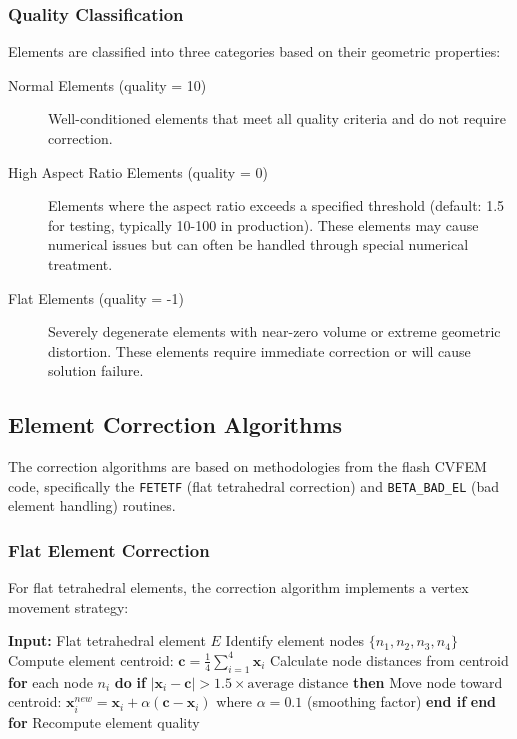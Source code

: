 \documentclass[12pt]{extarticle}
\newcommand{\<}{\langle}
\renewcommand{\>}{\rangle}
\theoremstyle{definition}
\begin{document}
\subsubsection{Quality Classification}

Elements are classified into three categories based on their geometric properties:

\begin{description}
    \item[Normal Elements (quality = 10)] Well-conditioned elements that meet all quality criteria and do not require correction.
    
    \item[High Aspect Ratio Elements (quality = 0)] Elements where the aspect ratio exceeds a specified threshold (default: 1.5 for testing, typically 10-100 in production). These elements may cause numerical issues but can often be handled through special numerical treatment.
    
    \item[Flat Elements (quality = -1)] Severely degenerate elements with near-zero volume or extreme geometric distortion. These elements require immediate correction or will cause solution failure.
\end{description}

\subsection{Element Correction Algorithms}

The correction algorithms are based on methodologies from the flash CVFEM code, specifically the \texttt{FETETF} (flat tetrahedral correction) and \texttt{BETA\_BAD\_EL} (bad element handling) routines.

\subsubsection{Flat Element Correction}

For flat tetrahedral elements, the correction algorithm implements a vertex movement strategy:

\begin{algorithm}
\caption{Flat Element Correction (FETETF)}
\begin{algorithmic}[1]
\State \textbf{Input:} Flat tetrahedral element $E$
\State Identify element nodes $\{n_1, n_2, n_3, n_4\}$
\State Compute element centroid: $\mathbf{c} = \frac{1}{4}\sum_{i=1}^{4} \mathbf{x}_i$
\State Calculate node distances from centroid
\State \textbf{for} each node $n_i$ \textbf{do}
    \State \quad \textbf{if} $|\mathbf{x}_i - \mathbf{c}| > 1.5 \times \text{average distance}$ \textbf{then}
        \State \quad \quad Move node toward centroid: $\mathbf{x}_i^{new} = \mathbf{x}_i + \alpha(\mathbf{c} - \mathbf{x}_i)$
        \State \quad \quad where $\alpha = 0.1$ (smoothing factor)
    \State \quad \textbf{end if}
\State \textbf{end for}
\State Recompute element quality
\end{algorithmic}
\end{algorithm}
\end{document}
